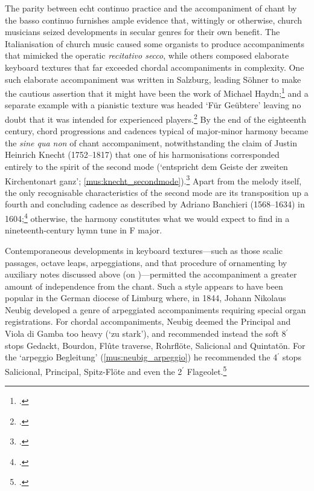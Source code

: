 The parity between echt continuo practice and the accompaniment of chant by the basso continuo furnishes ample evidence that, wittingly or otherwise, church musicians seized developments in secular genres for their own benefit.
The Italianisation of church music caused some organists to produce accompaniments that mimicked the operatic \emph{recitativo secco}, while others composed elaborate keyboard textures that far exceeded chordal accompaniments in complexity.
One such elaborate accompaniment was written in Salzburg, leading Söhner to make the cautious assertion that it might have been the work of Michael Haydn;\footcite[pp.~112--17, 195--6, and `Notenbeilagen' pp.~18--21, 49]{SoehnerGeschichteBegleitunggregorianischen1931} and a separate example with a pianistic texture was headed `Für Geübtere' leaving no doubt that it was intended for experienced players.\footcite[p.~5 and `Notenbeilage II']{WagenerBegleitunggregorianischenChorals1964}
%
By the end of the eighteenth century, chord progressions and cadences typical of major-minor harmony became the \emph{sine qua non} of chant accompaniment, notwithstanding the claim of Justin Heinrich Knecht (1752--1817) that one of his harmonisations corresponded entirely to the spirit of the second mode (`entspricht dem Geiste der zweiten Kirchentonart ganz'; \cref{mus:knecht_secondmode}).\footcite[60--61]{KnechtVollstandigeOrgelschulefur1798}
Apart from the melody itself, the only recognisable characteristics of the second mode are its transposition up a fourth and concluding cadence as described by Adriano Banchieri (1568--1634) in 1604;\footcite[41]{BanchieriOrganosuonarino1605} otherwise, the harmony constitutes what we would expect to find in a nineteenth-century hymn tune in F major.

Contemporaneous developments in keyboard textures---such as those scalic passages, octave leaps, arpeggiations, and that procedure of ornamenting by auxiliary notes discussed above (on )---permitted the accompaniment a greater amount of independence from the chant.
%
Such a style appears to have been popular in the German diocese of Limburg where, in 1844, Johann Nikolaus Neubig developed a genre of arpeggiated accompaniments requiring special organ registrations.
For chordal accompaniments, Neubig deemed the Principal and Viola di Gamba too heavy (`zu stark'), and recommended instead the soft 8$^\prime$ stops Gedackt, Bourdon, Flûte traverse, Rohrflöte, Salicional and Quintatön.
For the `arpeggio Begleitung' (\cref{mus:neubig_arpeggio}) he recommended the 4$^\prime$ stops Salicional, Principal, Spitz-Flöte and even the 2$^\prime$ Flageolet.\footcites[pp.~iii--v]{NeubiggregorianischeGesangbei1844}[54--61]{WagenerBegleitunggregorianischenChorals1964}

